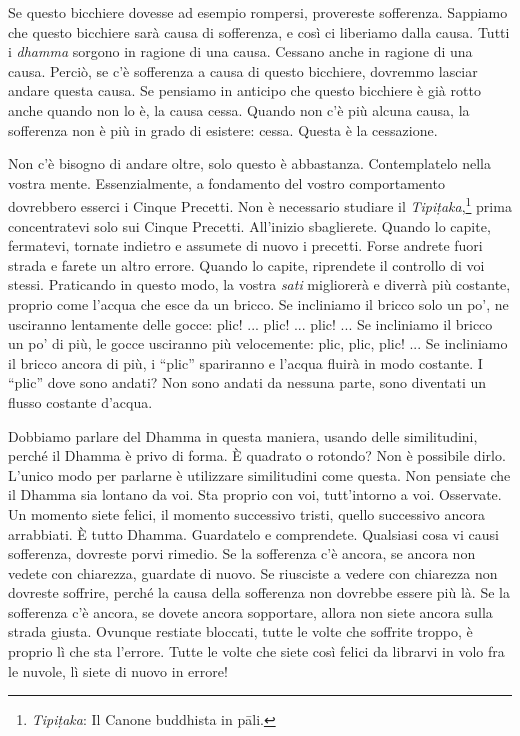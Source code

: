 Se questo bicchiere dovesse ad esempio rompersi, provereste sofferenza.
Sappiamo che questo bicchiere sarà causa di sofferenza, e così ci
liberiamo dalla causa. Tutti i \emph{dhamma} sorgono in ragione di una
causa. Cessano anche in ragione di una causa. Perciò, se c'è sofferenza
a causa di questo bicchiere, dovremmo lasciar andare questa causa. Se
pensiamo in anticipo che questo bicchiere è già rotto anche quando non
lo è, la causa cessa. Quando non c'è più alcuna causa, la sofferenza non
è più in grado di esistere: cessa. Questa è la cessazione.

Non c'è bisogno di andare oltre, solo questo è abbastanza. Contemplatelo
nella vostra mente. Essenzialmente, a fondamento del vostro
comportamento dovrebbero esserci i Cinque Precetti. Non è necessario
studiare il \emph{Tipiṭaka},\footnote{\emph{Tipiṭaka}: Il Canone
  buddhista in pāli.} prima concentratevi solo sui Cinque Precetti.
All'inizio sbaglierete. Quando lo capite, fermatevi, tornate indietro e
assumete di nuovo i precetti. Forse andrete fuori strada e farete un
altro errore. Quando lo capite, riprendete il controllo di voi stessi.
Praticando in questo modo, la vostra \emph{sati} migliorerà e diverrà
più costante, proprio come l'acqua che esce da un bricco. Se incliniamo
il bricco solo un po', ne usciranno lentamente delle gocce: plic! ...
plic! ... plic! ... Se incliniamo il bricco un po' di più, le gocce
usciranno più velocemente: plic, plic, plic! ... Se incliniamo il bricco
ancora di più, i ``plic'' spariranno e l'acqua fluirà in modo costante.
I ``plic'' dove sono andati? Non sono andati da nessuna parte, sono
diventati un flusso costante d'acqua.

Dobbiamo parlare del Dhamma in questa maniera, usando delle
similitudini, perché il Dhamma è privo di forma. È quadrato o rotondo?
Non è possibile dirlo. L'unico modo per parlarne è utilizzare
similitudini come questa. Non pensiate che il Dhamma sia lontano da voi.
Sta proprio con voi, tutt'intorno a voi. Osservate. Un momento siete
felici, il momento successivo tristi, quello successivo ancora
arrabbiati. È tutto Dhamma. Guardatelo e comprendete. Qualsiasi cosa vi
causi sofferenza, dovreste porvi rimedio. Se la sofferenza c'è ancora,
se ancora non vedete con chiarezza, guardate di nuovo. Se riusciste a
vedere con chiarezza non dovreste soffrire, perché la causa della
sofferenza non dovrebbe essere più là. Se la sofferenza c'è ancora, se
dovete ancora sopportare, allora non siete ancora sulla strada giusta.
Ovunque restiate bloccati, tutte le volte che soffrite troppo, è proprio
lì che sta l'errore. Tutte le volte che siete così felici da librarvi in
volo fra le nuvole, lì siete di nuovo in errore!

